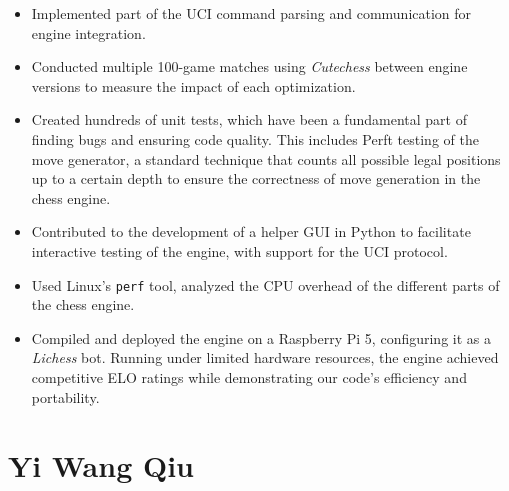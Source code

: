 \begin{itemize}[itemsep=1pt]
    \item Implemented part of the UCI command parsing and communication for engine integration.

    \item Conducted multiple 100-game matches using \textit{Cutechess} between engine versions to measure the impact of each optimization.

    \item Created hundreds of unit tests, which have been a fundamental part of finding bugs and ensuring code quality. This includes Perft testing of the move generator, a standard technique that counts all possible legal positions up to a certain depth to ensure the correctness of move generation in the chess engine.

    \item Contributed to the development of a helper GUI in Python to facilitate interactive testing of the engine, with support for the UCI protocol.    

    \item Used Linux's \texttt{perf} tool, analyzed the CPU overhead of the different parts of the chess engine.

    \item Compiled and deployed the engine on a Raspberry Pi 5, configuring it as a \textit{Lichess} bot. Running under limited hardware resources, the engine achieved competitive ELO ratings while demonstrating our code's efficiency and portability.

\end{itemize}

\section*{Yi Wang Qiu}

